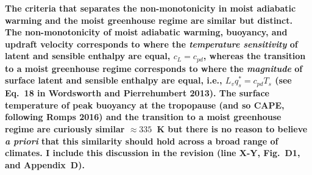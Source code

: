 \documentclass{article}
\begin{document}
\par
\textbf{The criteria that separates the non-monotonicity in moist adiabatic warming and the moist greenhouse regime are similar but distinct. The non-monotonicity of moist adiabatic warming, buoyancy, and updraft velocity corresponds to where the \textit{temperature sensitivity} of latent and sensible enthalpy are equal, $c_L = c_{pd}$, whereas the transition to a moist greenhouse regime corresponds to where the \textit{magnitude} of surface latent and sensible enthalpy are equal, i.e., $L_v q_s^* = c_{pd} T_s$ (see Eq.~18 in Wordsworth and Pierrehumbert 2013). The surface temperature of peak buoyancy at the tropopause (and so CAPE, following Romps 2016) and the transition to a moist greenhouse regime are curiously similar $\approx335$~K but there is no reason to believe \textit{a priori} that this similarity should hold across a broad range of climates. I include this discussion in the revision (line X-Y, Fig.~D1, and Appendix~D).}
\end{document}
